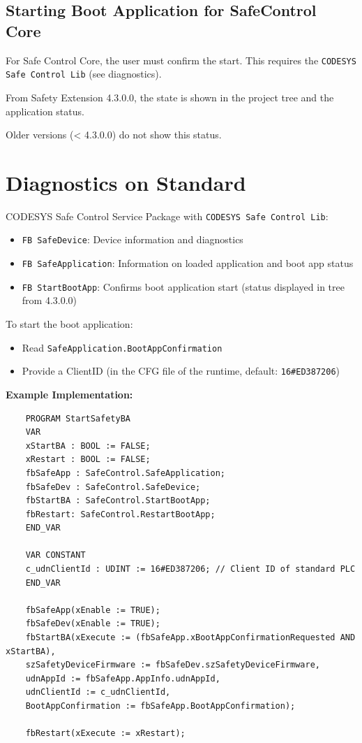 \documentclass[a4paper,12pt]{article}
\begin{document}
\subsection{Starting Boot Application for SafeControl Core}

For Safe Control Core, the user must confirm the start. This requires the \texttt{CODESYS Safe Control Lib} (see diagnostics).

From Safety Extension 4.3.0.0, the state is shown in the project tree and the application status.

Older versions (< 4.3.0.0) do not show this status.

\section{Diagnostics on Standard}

CODESYS Safe Control Service Package with \texttt{CODESYS Safe Control Lib}:

\begin{itemize}
	\item \texttt{FB SafeDevice}: Device information and diagnostics
	\item \texttt{FB SafeApplication}: Information on loaded application and boot app status
	\item \texttt{FB StartBootApp}: Confirms boot application start (status displayed in tree from 4.3.0.0)
\end{itemize}

To start the boot application:

\begin{itemize}
	\item Read \texttt{SafeApplication.BootAppConfirmation}
	\item Provide a ClientID (in the CFG file of the runtime, default: \texttt{16\#ED387206})
\end{itemize}

\textbf{Example Implementation:}
\begin{lstlisting}
	PROGRAM StartSafetyBA
	VAR
	xStartBA : BOOL := FALSE;
	xRestart : BOOL := FALSE;
	fbSafeApp : SafeControl.SafeApplication;
	fbSafeDev : SafeControl.SafeDevice;
	fbStartBA : SafeControl.StartBootApp;
	fbRestart: SafeControl.RestartBootApp;
	END_VAR
	
	VAR CONSTANT
	c_udnClientId : UDINT := 16#ED387206; // Client ID of standard PLC
	END_VAR
	
	fbSafeApp(xEnable := TRUE);
	fbSafeDev(xEnable := TRUE);
	fbStartBA(xExecute := (fbSafeApp.xBootAppConfirmationRequested AND xStartBA),
	szSafetyDeviceFirmware := fbSafeDev.szSafetyDeviceFirmware,
	udnAppId := fbSafeApp.AppInfo.udnAppId,
	udnClientId := c_udnClientId,
	BootAppConfirmation := fbSafeApp.BootAppConfirmation);
	
	fbRestart(xExecute := xRestart);
\end{lstlisting}
\end{document}
